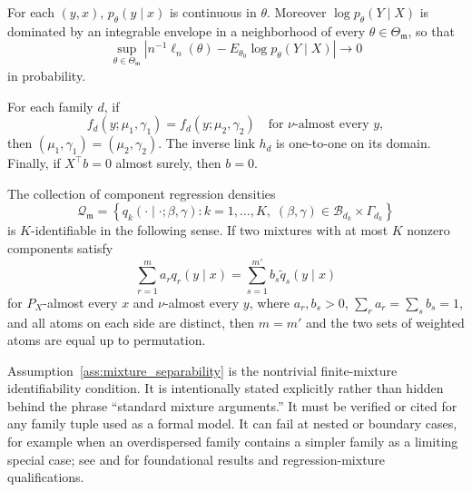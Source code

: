 \begin{assumption}
\label{ass:continuity}
For each \((y,x)\), \(p_\theta(y\mid x)\) is continuous in \(\theta\).  Moreover
\(\log p_\theta(Y\mid X)\) is dominated by an integrable envelope in a
neighborhood of every \(\theta\in\Theta_{\mathfrak m}\), so that
\[
    \sup_{\theta\in\Theta_{\mathfrak m}}
    \left|
    n^{-1}\ell_n(\theta)
    -
    E_{\theta_0}\log p_\theta(Y\mid X)
    \right|
    \to 0
\]
in probability.
\end{assumption}

\begin{assumption}
\label{ass:primitive_component}
For each family \(d\), if
\[
    f_d(y;\mu_1,\gamma_1)=f_d(y;\mu_2,\gamma_2)
    \quad\text{for \(\nu\)-almost every }y,
\]
then \((\mu_1,\gamma_1)=(\mu_2,\gamma_2)\).  The inverse link \(h_d\) is
one-to-one on its domain.  Finally, if \(X^\top b=0\) almost surely, then
\(b=0\).
\end{assumption}

\begin{assumption}
\label{ass:mixture_separability}
The collection of component regression densities
\[
    \mathcal Q_{\mathfrak m}
    =
    \left\{
    q_k(\cdot\mid\cdot;\beta,\gamma):
    k=1,\ldots,K,\;(\beta,\gamma)\in\mathcal B_{d_k}\times\Gamma_{d_k}
    \right\}
\]
is \(K\)-identifiable in the following sense.  If two mixtures with at most
\(K\) nonzero components satisfy
\[
    \sum_{r=1}^{m} a_r q_r(y\mid x)
    =
    \sum_{s=1}^{m'} b_s \tilde q_s(y\mid x)
\]
for \(P_X\)-almost every \(x\) and \(\nu\)-almost every \(y\), where
\(a_r,b_s>0\), \(\sum_r a_r=\sum_s b_s=1\), and all atoms on each side are
distinct, then \(m=m'\) and the two sets of weighted atoms are equal up to
permutation.
\end{assumption}

\begin{remark}
Assumption~\ref{ass:mixture_separability} is the nontrivial finite-mixture
identifiability condition.  It is intentionally stated explicitly rather than
hidden behind the phrase ``standard mixture arguments.''  It must be verified
or cited for any family tuple used as a formal model.  It can fail at nested or
boundary cases, for example when an overdispersed family contains a simpler
family as a limiting special case; see \citet{teicher1963identifiability} and
\citet{hennig2000identifiability} for foundational results and regression-mixture
qualifications.
\end{remark}

